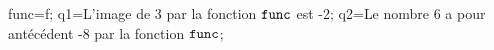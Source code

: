 \documentclass[exercice]{thedocument}%
\begin{document}
%
    \>func=f;%
    \>q1={L'image de 3 par la fonction $\<func;$ est -2};%
    \>q2={Le nombre 6 a pour antécédent -8 par la fonction $\<func;$};%
\end{document}

